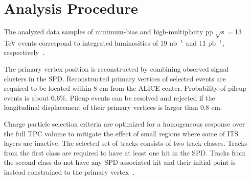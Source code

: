 \section{Analysis Procedure}
\label{sec:ana}

The analyzed data samples of minimum-bias and high-multiplicity pp $\sqrt{s}=$13 TeV events correspond to integrated luminosities of 19 nb$^{-1}$ and 11 pb$^{-1}$, respectively~\cite{ALICE-PUBLIC-2016-002}.

The primary vertex position is reconstructed by combining observed signal clusters in the SPD. Reconstructed primary vertices of selected events are required to be located within 8 cm from the ALICE center. Probability of pileup events is about 0.6\%. Pileup events can be resolved and rejected if the longitudinal displacement of their primary vertices is larger than 0.8 cm.

Charge particle selection criteria are optimized for a homogeneous response over the full TPC volume to mitigate the effect of small regions where some of ITS layers are inactive. The selected set of tracks consists of two track classes. Tracks from the first class are required to have at least one hit in the SPD. Tracks from the second class do not have any SPD associated hit and their initial point is instead constrained to the primary vertex~\cite{20151:HybridTracks}.

